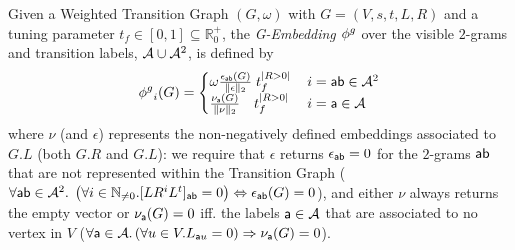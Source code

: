 \begin{definition}[G-Embedding]\label{def:ppne}
Given a Weighted Transition Graph $(G,\omega)$ with $G=(V,s,t,L,R)$ and a tuning parameter $t_f\in[0,1]\subseteq\mathbb{R}^+_{0}$, the \emph{G-Embedding} 
${\phi^{g}}$ over the visible $2$-grams and transition labels, $\mathcal{A}\cup\mathcal{A}^2$, is defined by
$${\phi^{g}}_{i}(G)=\begin{cases}
	\omega \frac{\epsilon_{\mathsf{ab}}(G)}{\|\epsilon\|_2}\;t_f^{|R>0|}\, & {i}=\mathsf{ab}\in\mathcal{A}^2\\
	\frac{\nu_{\mathsf{a}}(G)}{\|\nu\|_2}\;\;\;\,t_f^{|R>0|}\, & {i}=\mathsf{a}\in\mathcal{A}\\
\end{cases}$$
where $\nu$ (and $\epsilon$) represents the non-negatively defined embeddings associated to $G.L$ (both $G.R$ and $G.L$): {we require that  $\epsilon$  returns $\epsilon_{\mathsf{ab}}=0$ for the $2$-grams $\mathsf{ab}$ that are not represented within the Transition Graph ($\forall \mathsf{ab}\in\mathcal{A}^2.\; \left(\forall i\in\mathbb{N}_{\neq0}. [LR^iL^t]_{\mathsf{ab}}=0\right) \Leftrightarrow \epsilon_{\mathsf{ab}}(G)=0$), and either $\nu$ always returns the empty vector or $\nu_{\mathsf{a}}(G)=0$ iff. the labels $\mathsf{a}\in\mathcal{A}$ that are associated to no vertex in $V$ ($\forall \mathsf{a}\in\mathcal{A}. \left(\forall u\in V. L_{\mathsf{a}u}=0\right)\Rightarrow \nu_{\mathsf{a}}(G)=0$).}
\end{definition}
